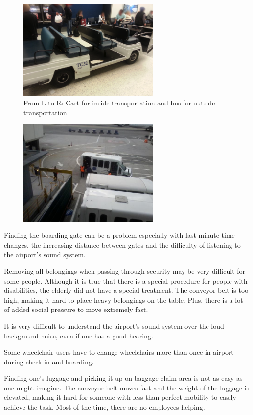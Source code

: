 \documentclass[a4paper, 12pt,conference]{new_cit_thesis}
\begin{document}
\begin{list}{-}{}
\begin{figure}[h]
  \centering
     \includegraphics[width=7cm]{images/image037}
   \caption{From L to R: Cart for inside transportation and bus for outside transportation}
  \label{fig:37}
\end{figure}
\begin{figure}[h]
  \centering
     \includegraphics[width=7cm]{images/image038}
  \label{fig:38}
\end{figure}


  \item Finding the boarding gate can be a problem especially with last minute time changes, the increasing distance between gates and the difficulty of listening to the airport’s sound system.
  \item Removing all belongings when passing through security may be very difficult for some people. Although it is true that there is a special procedure for people with disabilities, the elderly did not have a special treatment.  The conveyor belt is too high, making it hard to place heavy belongings on the table. Plus, there is a lot of added social pressure to move extremely fast.
  \item It is very difficult to understand the airport’s sound system over the loud background noise, even if one has a good hearing.
  \item Some wheelchair users have to change wheelchairs more than once in airport during check-in and boarding.
  \item Finding one’s luggage and picking it up on baggage claim area is not as easy as one might imagine. The conveyor belt moves fast and the weight of the luggage is elevated, making it hard for someone with less than perfect mobility to easily achieve the task. Most of the time, there are no employees helping.


\end{list}
\end{document}
